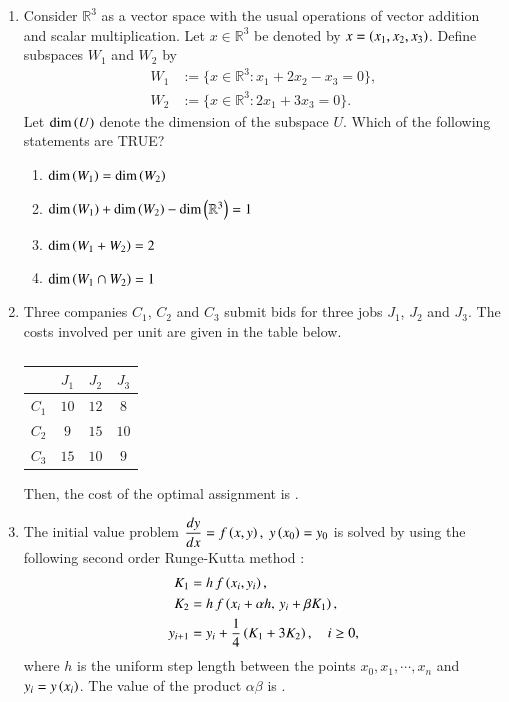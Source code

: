 \documentclass[journal,12pt,onecolumn]{IEEEtran}
\theoremstyle{remark}
\begin{document}
\begin{enumerate}
\item Consider $\mathbb{R}^3$ as a vector space with the usual operations of vector addition and scalar multiplication. Let $x \in \mathbb{R}^3$ be denoted by $x = \left(x_1, x_2, x_3\right)$. Define subspaces $W_1$ and $W_2$ by
\begin{align*}
W_1 &:= \{ x \in \mathbb{R}^3 \colon x_1 + 2x_2 - x_3 = 0 \},\\
W_2 &:= \{ x \in \mathbb{R}^3 \colon 2x_1 + 3x_3 = 0 \}.
\end{align*}
Let $\dim\left(U\right)$ denote the dimension of the subspace $U$. Which of the following statements are TRUE?

\hfill{}

\begin{enumerate}
\item $\dim\left(W_1\right) = \dim\left(W_2\right)$
\item $\dim\left(W_1\right) + \dim\left(W_2\right) - \dim\left(\mathbb{R}^3\right) = 1$
\item $\dim\left(W_1 + W_2\right) = 2$
\item $\dim\left(W_1 \cap W_2\right) = 1$
\end{enumerate}

\item Three companies $C_1$, $C_2$ and $C_3$ submit bids for three jobs $J_1$, $J_2$ and $J_3$. The costs involved per unit are given in the table below.

\begin{table}[H]
\centering
\caption*{}
\label{tab:assignment}
\begin{tabular}{|c|c|c|c|}
\hline
 & $J_1$ & $J_2$ & $J_3$ \\
\hline
$C_1$ & $10$ & $12$ & $8$ \\
$C_2$ & $9$ & $15$ & $10$ \\
$C_3$ & $15$ & $10$ & $9$ \\
\hline
\end{tabular}
\end{table}

Then, the cost of the optimal assignment is \underline{\hspace{2cm}}.

\hfill{}

\item The initial value problem $\dfrac{dy}{dx} = f\left(x,y\right),\; y\left(x_0\right)=y_0$ is solved by using the following second order Runge-Kutta method $\colon$
\begin{align*}
K_1 &= h\,f\left(x_i, y_i\right),\\
K_2 &= h\,f\left(x_i + \alpha h,\, y_i + \beta K_1\right),\\
y_{i+1} &= y_i + \dfrac{1}{4}\left(K_1 + 3K_2\right),\quad i \geq 0,
\end{align*}
where $h$ is the uniform step length between the points $x_0, x_1, \cdots, x_n$ and $y_i = y\left(x_i\right)$. The value of the product $\alpha\beta$ is \underline{\hspace{2cm}} .


\end{enumerate}
\end{document}
